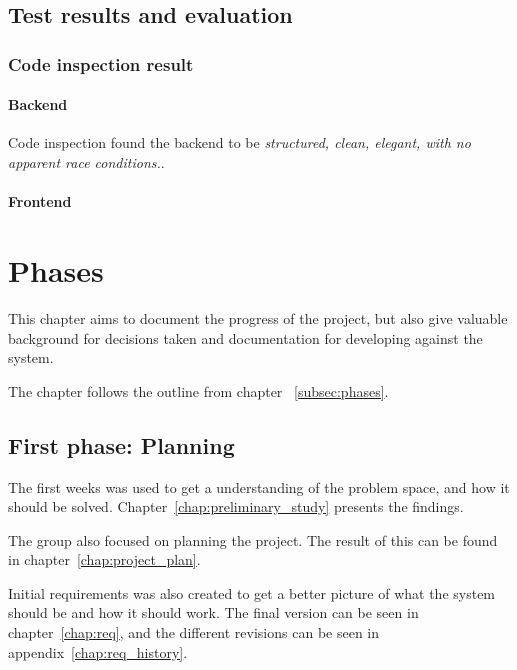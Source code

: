\documentclass[11pt]{book}
\begin{document}

\section{Test results and evaluation}

\subsection{Code inspection result}

\subsubsection{Backend}

Code inspection found the backend to be \emph{structured, clean, elegant, with no apparent race conditions.}.

\subsubsection{Frontend}


\chapter{Phases}
This chapter aims to document the progress of the project, but also give valuable background for decisions taken and documentation for developing against the system.

The chapter follows the outline from chapter ~\ref{subsec:phases}.

\section{First phase: Planning}
The first weeks was used to get a understanding of the problem space, and how it should be solved. Chapter~\ref{chap:preliminary_study} presents the findings.

The group also focused on planning the project. The result of this can be found in chapter~\ref{chap:project_plan}.

Initial requirements was also created to get a better picture of what the system should be and how it should work. The final version can be seen in chapter~\ref{chap:req}, and the different revisions can be seen in appendix~\ref{chap:req_history}.
\end{document}
